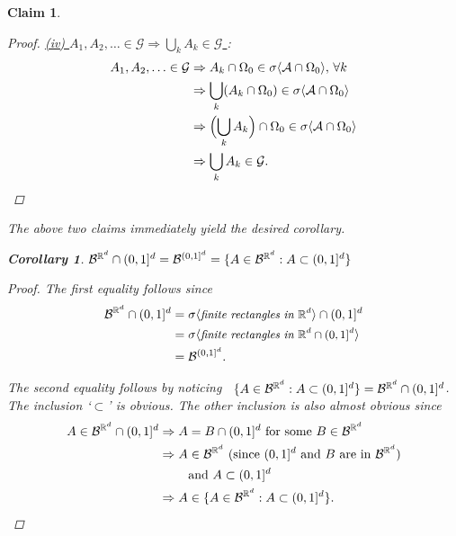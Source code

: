 \documentclass[10pt,letterpaper,twocolumn]{article}
\newtheorem{corollary}{Corollary}
\newtheorem{claim}{Claim}
\begin{document}
\begin{claim}
\begin{proof}
  \vspace{.2cm}
\noindent
\underline{(iv) $A_1,A_2,\ldots \in \mathcal G \Rightarrow \bigcup_k A_k\in \mathcal G$ }:
\begin{align*}
A_1,A_2,\ldots \in \mathcal G&\Rightarrow A_k\cap \Omega_0 \in \sigma\langle \mathcal A\cap \Omega_0\rangle,\,\forall k \\
&\Rightarrow  \bigcup_k (A_k\cap \Omega_0) \in\sigma\langle \mathcal A\cap \Omega_0\rangle \\
 &\Rightarrow  \Bigl(\bigcup_k A_k\Bigr)\cap \Omega_0 \in\sigma\langle \mathcal A\cap \Omega_0\rangle \\
&\Rightarrow  \bigcup_k A_k\in \mathcal G.
\end{align*}


\end{proof}



The above two claims immediately yield the desired corollary.
\begin{corollary} $\mathcal B^{\Bbb R^d}\cap (0,1]^d =\mathcal B^{(0,1]^d} = \{ A\in\mathcal B^{\Bbb R^d}: A\subset (0,1]^d\}$
\end{corollary}
\begin{proof}
The first equality follows since
\begin{align*}
\mathcal B^{\Bbb R^d}\cap (0,1]^d &= \sigma\langle \textit{\small finite rectangles in $\Bbb R^d$}\rangle \cap (0,1]^d \\
&= \sigma\langle \textit{\small finite rectangles in $\Bbb R^d \cap (0,1]^d$}\rangle  \\
&=\mathcal B^{(0,1]^d} .
\end{align*}


The second equality follows by noticing \mbox{ $ \{ A\in\mathcal B^{\Bbb R^d}: A\subset (0,1]^d\}=\mathcal B^{\Bbb R^d}\cap (0,1]^d$}. The inclusion `$\subset$' is obvious. The other inclusion is also almost obvious since
\begin{align*}
 A\in \mathcal B^{\Bbb R^d}\cap (0,1]^d&\Rightarrow \text{$A=B\cap (0,1]^d$ for some $B\in\mathcal B^{\Bbb R^d}$}\\
 &\Rightarrow \text{$A\in \mathcal B^{\Bbb R^d}$  (since $(0,1]^d$ and $ B$ are in $\mathcal B^{\Bbb R^d}$)}\\
 &\qquad\text{ and $A\subset (0,1]^d$  }\\
  &\Rightarrow  A \in \{ A\in\mathcal B^{\Bbb R^d}: A\subset (0,1]^d\}.
\end{align*}
\end{proof}


\end{claim}
\end{document}
